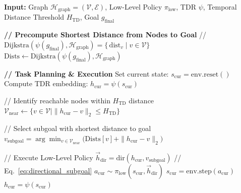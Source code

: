 \documentclass{article}
\begin{document}
\begin{algorithm}[H]
    \caption{Task Planning and Execution}
    \label{algo:task_planning_execution}
    \begin{algorithmic}
        \STATE \textbf{Input:} Graph $\mathcal{H}_{\text{graph}}=(\mathcal{V}, \mathcal{E})$, Low-Level Policy $\pi_{\text{low}}$, TDR $\psi$, Temporal Distance Threshold $H_{\text{TD}}$, Goal $g_{\text{final}}$

        \vspace{10pt} 
        
        \STATE \textbf{// Precompute Shortest Distance from Nodes to Goal}
        \STATE // $\mathrm{Dijkstra}(\psi(g_{\text{final}}), \mathcal{H}_{\text{graph}})=\{\,\mathrm{dist}_v\mid v\in\mathcal V\}$
        \STATE $\mathrm{Dists} \gets \mathrm{Dijkstra}(\psi(g_{\text{final}}), \mathcal{H}_{\text{graph}})$
        
        \vspace{10pt} 
        
        \STATE \textbf{// Task Planning \& Execution}
        \STATE Set current state: $s_{\text{cur}} =  \mathrm{env.reset}() $
        \STATE Compute TDR embedding: $h_{\text{cur}} = \psi(s_{\text{cur}})$
        
            \STATE // Identify reachable nodes within $H_{\text{TD}}$ distance
            \STATE $\mathcal{V}_{\text{near}} \gets \{ v \in \mathcal{V} \mid \|h_{\text{cur}}-v\|_2 \leq H_{\text{TD}} \}$
            
            \vspace{10pt} 
            
            \STATE // Select subgoal with shortest distance to goal
            \STATE $v_{\text{subgoal}} = \arg\min_{v \in \mathcal{V}_{\text{near}}} \bigl(\mathrm{Dists}[v] + \|h_{\text{cur}}-v\|_2\bigr)$

            \vspace{10pt} 
            
            \STATE // Execute Low-Level Policy
            \STATE $\vec{h}_\text{dir} = \mathrm{dir}(h_{\text{cur}}, v_{\text{subgoal}})$ // Eq.~\eqref{eq:directional_subgoal} 
            \STATE $a_{\text{cur}} \sim \pi_{\text{low}}(s_{\text{cur}}, \vec{h}_\text{dir})$
            \STATE $s_{\text{cur}} = \mathrm{env.step}(a_{\text{cur}}) $
            \STATE $h_{\text{cur}} = \psi(s_{\text{cur}})$
        \ENDWHILE
    \end{algorithmic}
\end{algorithm}
\end{document}
